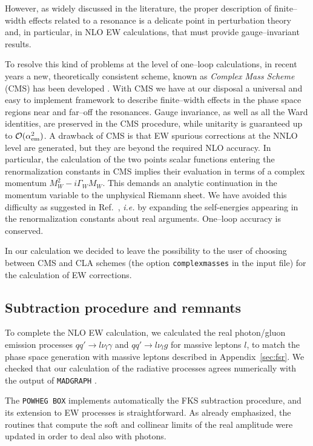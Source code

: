 \documentclass[11pt,a4paper]{article}
\newcommand\POWHEGBOX{\texttt{POWHEG BOX}}
\newcommand\aem{\alpha_{\rm em}}
\begin{document}
However, as widely discussed in the literature, the proper description of finite--width effects related 
to a resonance is a delicate point in perturbation theory and, in particular, in NLO EW calculations,
that must provide gauge--invariant results.

To resolve this kind of problems at the level of one--loop calculations, in recent 
years a new, theoretically consistent scheme, known as \emph{Complex Mass Scheme} (CMS) has been 
developed \cite{Denner:2005fg,Denner:2006ic}. With CMS we have 
at our disposal a universal and easy to implement framework to describe finite--width effects
in the phase space regions near and far--off the resonances. Gauge invariance, as
well as all the Ward identities, are preserved in the CMS procedure, 
while unitarity is guaranteed up to $\mathcal{O}(\aem^2)$. A drawback of CMS 
is that EW spurious corrections at the NNLO level are generated, but they are beyond the
required NLO accuracy. In particular, the calculation of the two points scalar functions entering 
the renormalization constants in CMS 
implies their evaluation in terms of a complex momentum $M_W^2 - i\Gamma_W M_W$. This demands an analytic
continuation in the momentum variable to the unphysical Riemann sheet. We have avoided this 
difficulty as suggested in Ref.~\cite{Denner:2005fg}, 
{\it i.e.} by expanding the self-energies appearing in the 
renormalization constants about real arguments. One--loop accuracy is conserved.

In our calculation we decided to leave the possibility to the user 
of choosing between CMS and CLA schemes (the option \texttt{complexmasses} in the input file)
for the calculation of EW corrections.

\subsection{Subtraction procedure and remnants}
\label{sec:sub}

To complete the NLO EW calculation, we calculated the real
photon/gluon emission processes $qq'\rightarrow l \nu_l \gamma$ and
$qq'\rightarrow l \nu_l g$ for massive leptons $l$, to match the phase
space generation with massive leptons described in Appendix~\ref{sec:fsr}.  We checked that our
calculation of the radiative processes agrees numerically with the
output of \texttt{MADGRAPH} \cite{Alwall:2011uj}.

The \POWHEGBOX{} implements automatically the FKS subtraction procedure,
and its extension to EW processes is straightforward. As already emphasized, the routines that
compute the soft and collinear limits of the real amplitude were
updated in order to deal also with photons.
\end{document}
